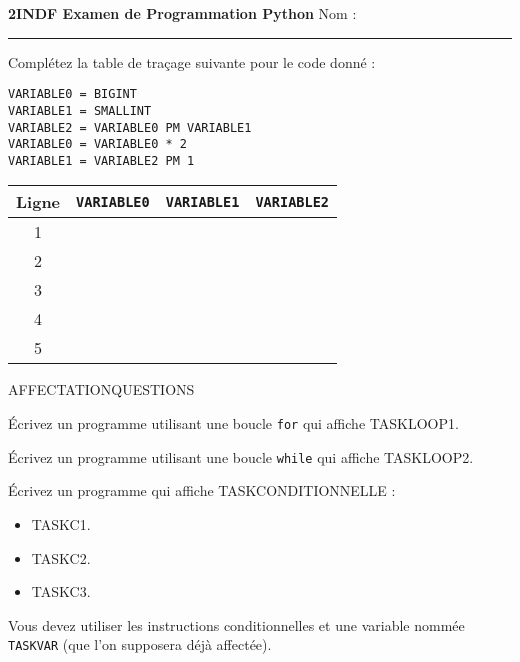 \documentclass[12pt]{exam}
\begin{document}
\begin{center}
\textbf{2INDF Examen de Programmation Python} \hfill Nom : \rule{6cm}{0.4pt}
\end{center}

\begin{questions}

\question[5] Complétez la table de traçage suivante pour le code donné :

\hfill
\begin{minipage}[t]{0.2\textwidth}
\vspace{0mm}
\begin{lstlisting}
VARIABLE0 = BIGINT
VARIABLE1 = SMALLINT
VARIABLE2 = VARIABLE0 PM VARIABLE1
VARIABLE0 = VARIABLE0 * 2
VARIABLE1 = VARIABLE2 PM 1
\end{lstlisting}
\end{minipage}
\hfill
\begin{minipage}[t]{0.4\textwidth}
\vspace{-4mm}
    \begin{tabular}{|c|p{5mm}|p{5mm}|p{5mm}|}
        \hline
        {\footnotesize Ligne} & \texttt{VARIABLE0} & \texttt{VARIABLE1} & \texttt{VARIABLE2} \\
        \hline
        1 &  &  &  \\
        \hline
        2 &  &  &  \\
        \hline
        3 &  &  &  \\
        \hline
        4 &  &  &  \\
        \hline
        5 &  &  &  \\
        \hline
    \end{tabular}
\end{minipage}

AFFECTATIONQUESTIONS

\question[5] Écrivez un programme utilisant une boucle \texttt{for} qui affiche TASKLOOP1.
\fillwithgrid{24mm}

\question[5] Écrivez un programme utilisant une boucle \texttt{while} qui affiche TASKLOOP2.
\fillwithgrid{32mm}

\newpage
\question[5] Écrivez un programme qui affiche TASKCONDITIONNELLE :
\begin{itemize}
    \item TASKC1.
    \item TASKC2.
    \item TASKC3.
\end{itemize}
Vous devez utiliser les instructions conditionnelles et une variable nommée \texttt{TASKVAR} (que l'on supposera déjà affectée).
\smallskip\fillwithgrid{45mm}


\end{questions}
\end{document}
